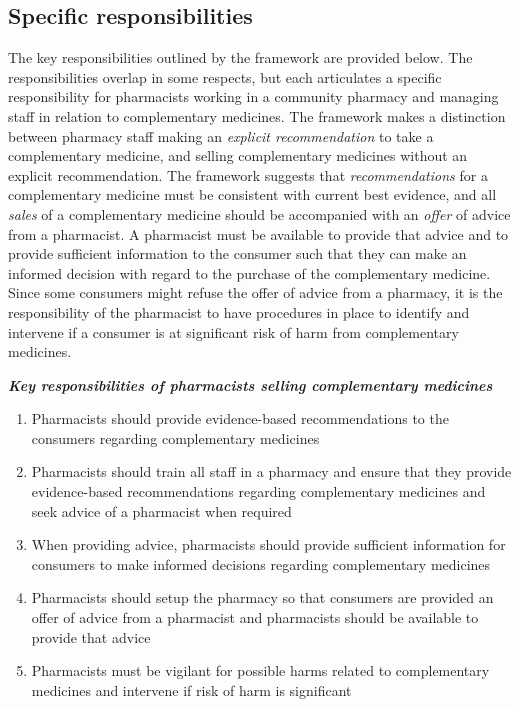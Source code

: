 \documentclass[12pt,]{article}
\providecommand{\tightlist}{%
  \setlength{\itemsep}{0pt}\setlength{\parskip}{0pt}}
\begin{document}
\subsection{Specific responsibilities}\label{specific-responsibilities}

The key responsibilities outlined by the framework are provided below.
The responsibilities overlap in some respects, but each articulates a
specific responsibility for pharmacists working in a community pharmacy
and managing staff in relation to complementary medicines. The framework
makes a distinction between pharmacy staff making an \emph{explicit
recommendation} to take a complementary medicine, and selling
complementary medicines without an explicit recommendation. The
framework suggests that \emph{recommendations} for a complementary
medicine must be consistent with current best evidence, and all
\emph{sales} of a complementary medicine should be accompanied with an
\emph{offer} of advice from a pharmacist. A pharmacist must be available
to provide that advice and to provide sufficient information to the
consumer such that they can make an informed decision with regard to the
purchase of the complementary medicine. Since some consumers might
refuse the offer of advice from a pharmacy, it is the responsibility of
the pharmacist to have procedures in place to identify and intervene if
a consumer is at significant risk of harm from complementary medicines.

\textbf{\emph{Key responsibilities of pharmacists selling complementary
medicines}}

\begin{enumerate}
\def\labelenumi{\arabic{enumi}.}
\tightlist
\item
  Pharmacists should provide evidence-based recommendations to the
  consumers regarding complementary medicines
\item
  Pharmacists should train all staff in a pharmacy and ensure that they
  provide evidence-based recommendations regarding complementary
  medicines and seek advice of a pharmacist when required
\item
  When providing advice, pharmacists should provide sufficient
  information for consumers to make informed decisions regarding
  complementary medicines
\item
  Pharmacists should setup the pharmacy so that consumers are provided
  an offer of advice from a pharmacist and pharmacists should be
  available to provide that advice
\item
  Pharmacists must be vigilant for possible harms related to
  complementary medicines and intervene if risk of harm is significant
\end{enumerate}
\end{document}

